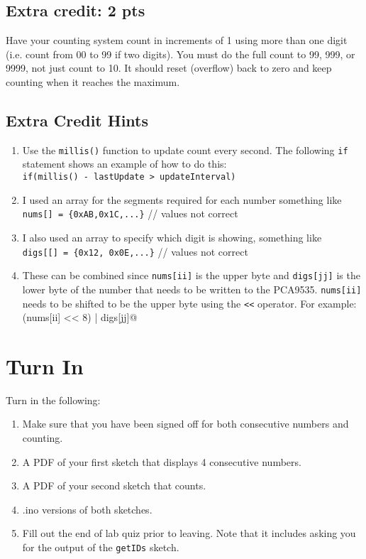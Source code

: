 \subsection{Extra credit: 2 pts}
Have your counting system count in increments of 1 using more than one digit (i.e. 
count from 00 to 99 if two digits). You must do the full count to 99, 999, or 9999,
not just count to 10. It should reset (overflow) back to zero and keep counting 
when it reaches the maximum. 
\subsection{Extra Credit Hints}
\begin{enumerate}
    \item Use the \lstinline|millis()| function to update count every second. The 
            following \lstinline|if| statement shows an example of how to do this: \\
            \lstinline|if(millis() - lastUpdate > updateInterval)|
    \item I used an array for the segments required for each number something like \\
            \lstinline|nums[] = {0xAB,0x1C,...}|  // values not correct
    \item I also used an array to specify which digit is showing, something like \\
            \lstinline|digs[[] = {0x12, 0x0E,...}| // values not correct
    \item These can be combined since \lstinline|nums[ii]| is the upper byte and 
            \lstinline|digs[jj]| is the lower byte of the number that needs to be 
            written to the PCA9535. \lstinline|nums[ii]| needs to be shifted to be 
            the upper byte using the \lstinline|<<| operator. For example: \\
            \lstinline@(nums[ii] << 8) | digs[jj]@ 
\end{enumerate}

\section{Turn In}
Turn in the following:
\begin{enumerate}
    \item Make sure that you have been signed off for both consecutive numbers and counting.
    \item A PDF of your first sketch that displays 4 consecutive numbers.
    \item A PDF of your second sketch that counts.
    \item .ino versions of both sketches.
    \item Fill out the end of lab quiz prior to leaving. Note that it includes asking you 
            for the output of the \lstinline$getIDs$ sketch. 
\end{enumerate}